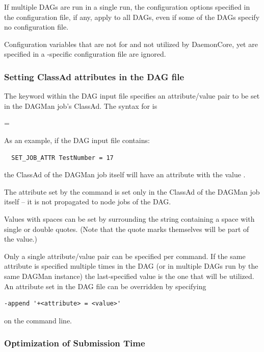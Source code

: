 If multiple DAGs are run in a single  run, 
the configuration options specified in the  configuration
file, if any, apply to all DAGs, even if some of the DAGs specify no
configuration file.

Configuration variables that are not for 
and not utilized by DaemonCore, yet are specified in a
-specific configuration file are ignored.

\subsubsection{\label{sec:DAG-SetAttributes}Setting ClassAd attributes in the DAG file}

The  keyword within the DAG input file specifies
an attribute/value pair to be set in the DAGMan job's ClassAd.
The syntax for  is

 =

As an example, if the DAG input file contains:
\begin{verbatim}
  SET_JOB_ATTR TestNumber = 17
\end{verbatim}
the ClassAd of the DAGMan job itself will have an attribute
 with the value .

The attribute set by the  command is set only
in the ClassAd of the DAGMan job itself -- it is not propagated to
node jobs of the DAG.

Values with spaces can be set by surrounding the string containing a
space with single or double quotes.  (Note that the quote marks
themselves will be part of the value.)

Only a single attribute/value pair can be specified per
 command.  If the same attribute is specified
multiple times in the DAG (or in multiple DAGs run by the same
DAGMan instance) the last-specified value is the one that will
be utilized.  An attribute set in the DAG file can be overridden
by specifying
\begin{verbatim}
-append '+<attribute> = <value>'
\end{verbatim}
on the  command line.

\subsubsection{\label{sec:OptimizingDAGSubmissionTime}Optimization of Submission Time}

